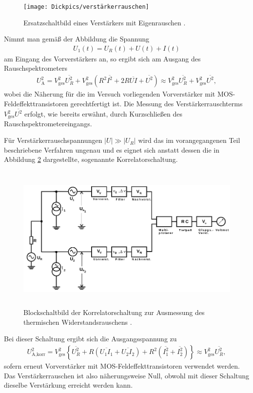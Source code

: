 \begin{figure}
  \centering
  \texttt{[image: Dickpics/verstärkerrauschen]}
  \caption{Ersatzschaltbild eines Verstärkers mit Eigenrauschen \cite{anleitung}.}
  \label{fig:verstärkerrauschen}
\end{figure}

Nimmt man gemäß der Abbildung die Spannung
\begin{align}
  U_1(t) = U_R(t) + U(t) + I(t)
\end{align}
am Eingang des Vorverstärkers an, so ergibt sich am Ausgang des Rauschspektrometers
\begin{align}
  U_\text{A}^2 = V_\text{ges}^2 \overline{U_R^2} + V_\text{ges}^2 \left( R^2 \overline{I^2} + 2 R \overline{U I} + \overline{U^2} \right) \approx V_\text{ges}^2 \overline{U_R^2} + V_\text{ges}^2 \overline{U^2},
\end{align}
wobei die Näherung für die im Versuch vorliegenden Vorverstärker mit MOS-Feldeffekttransistoren gerechtfertigt ist.
Die Messung des Verstärkerrauschterms $V_\text{ges}^2 \overline{U^2}$ erfolgt, wie bereits erwähnt, durch Kurzschließen des
Rauschspektrometereingangs.

Für Verstärkerrauschspannungen $|U| \gg |U_R|$ wird das im vorangegangenen Teil beschriebene Verfahren ungenau und es eignet sich
anstatt dessen die in Abbildung \ref{fig:korrelatorschaltung} dargestellte, sogenannte Korrelatorschaltung.

\begin{figure}
  \centering
  \includegraphics[height=7.3cm]{Dickpics/korrelatorschaltung.png}
  \caption{Blockschaltbild der Korrelatorschaltung zur Ausmessung des thermischen Widerstandsrauschens \cite{anleitung}.}
  \label{fig:korrelatorschaltung}
\end{figure}

Bei dieser Schaltung ergibt sich die Ausgangsspannung zu
\begin{align}
  U_\text{A,korr}^2 = V_\text{ges}^2 \left \{ \overline{U_R^2} + R \left( \overline{U_1 I_1} + \overline{U_2 I_2} \right) + R^2 \left( \overline{I_1^2} + \overline{I_2^2} \right) \right \} \approx V_\text{ges}^2 \overline{U_R^2},
\end{align}
sofern erneut Vorverstärker mit MOS-Feldeffekttransistoren verwendet werden. Das Verstärkerrauschen ist also näherungsweise Null, obwohl
mit dieser Schaltung dieselbe Verstärkung erreicht werden kann.

